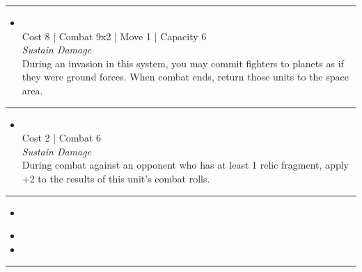 \begin{multicols}{2}
\vspace{-10pt}\rule{\hsize}{0.4pt}\vspace{5pt}


\begin{itemize}
\item {}\\
Cost 8 | Combat 9x2 | Move 1 | Capacity 6 \\
\emph{Sustain Damage}\\
During an invasion in this system, you may commit fighters to planets as if they were ground forces. When combat ends, return those units to the space area.
\end{itemize}

\vspace{-10pt}\rule{\hsize}{0.4pt}\vspace{5pt}


\begin{itemize}
\item {}
\\
Cost 2 | Combat 6 \\
\emph{Sustain Damage}\\
During combat against an opponent who has at least 1 relic fragment, apply +2 to the results of this unit's combat rolls. 
\end{itemize}

\vspace{-10pt}\rule{\hsize}{0.4pt}\vspace{5pt}


\begin{itemize}
\item \crystalFighterI
\end{itemize}

\columnbreak
{}

\begin{itemize}
\item \crystalFighterII
\item \neuroglaive
\end{itemize}

\vspace{-10pt}\rule{\hsize}{0.4pt}\vspace{5pt}


\end{multicols}
